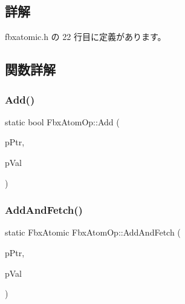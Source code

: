 \subsection{詳解}


 fbxatomic.\+h の 22 行目に定義があります。



\subsection{関数詳解}
\mbox{\label{class_fbx_atom_op_aa542a502e1881026c6936deb39c9641e}} 
\subsubsection{\texorpdfstring{Add()}{Add()}}
{\footnotesize\ttfamily static bool Fbx\+Atom\+Op\+::\+Add (\begin{DoxyParamCaption}\item[{volatile Fbx\+Atomic $\ast$}]{p\+Ptr,  }\item[{Fbx\+Atomic}]{p\+Val }\end{DoxyParamCaption})\hspace{0.3cm}{\ttfamily [static]}}

\mbox{\label{class_fbx_atom_op_a2eca6078f6e7257334866f900fd32f34}} 
\subsubsection{\texorpdfstring{Add\+And\+Fetch()}{AddAndFetch()}}
{\footnotesize\ttfamily static Fbx\+Atomic Fbx\+Atom\+Op\+::\+Add\+And\+Fetch (\begin{DoxyParamCaption}\item[{volatile Fbx\+Atomic $\ast$}]{p\+Ptr,  }\item[{Fbx\+Atomic}]{p\+Val }\end{DoxyParamCaption})\hspace{0.3cm}{\ttfamily [static]}}

\mbox{\label{class_fbx_atom_op_a76ab2e12877aae1b3f5a9625a04e1aac}} 
